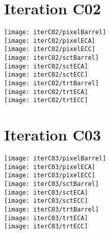 \documentclass[10pt]{article}
\begin{document}
\section{Iteration C02}

\begin{centering}


\texttt{[image: iterC02/pixelBarrel]}\\
\texttt{[image: iterC02/pixelECA]}\\
\texttt{[image: iterC02/pixelECC]}\\

\texttt{[image: iterC02/sctBarrel]}\\
\texttt{[image: iterC02/sctECA]}\\
\texttt{[image: iterC02/sctECC]}\\

\texttt{[image: iterC02/trtBarrel]}\\
\texttt{[image: iterC02/trtECA]}\\
\texttt{[image: iterC02/trtECC]}\\

\end{centering}
\vspace{10pt}
\section{Iteration C03}

\begin{centering}


\texttt{[image: iterC03/pixelBarrel]}\\
\texttt{[image: iterC03/pixelECA]}\\
\texttt{[image: iterC03/pixelECC]}\\

\texttt{[image: iterC03/sctBarrel]}\\
\texttt{[image: iterC03/sctECA]}\\
\texttt{[image: iterC03/sctECC]}\\

\texttt{[image: iterC03/trtBarrel]}\\
\texttt{[image: iterC03/trtECA]}\\
\texttt{[image: iterC03/trtECC]}\\

\end{centering}
\vspace{10pt}
\end{document}
